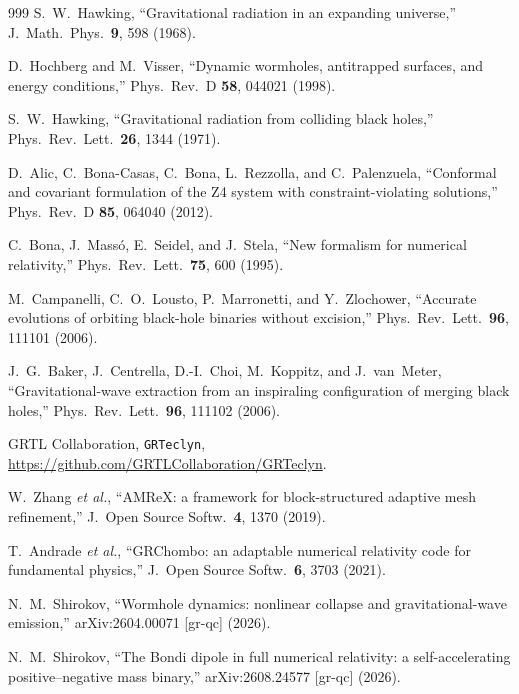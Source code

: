 \documentclass[twocolumn,floatfix,aps,prd,superscriptaddress,nofootinbib]{revtex4-2}
\begin{document}
\begin{thebibliography}{999}
S.~W.~Hawking,
\newblock ``Gravitational radiation in an expanding universe,''
\newblock J.\ Math.\ Phys.\ \textbf{9}, 598 (1968).

D.~Hochberg and M.~Visser,
\newblock ``Dynamic wormholes, antitrapped surfaces, and energy conditions,''
\newblock Phys.\ Rev.\ D \textbf{58}, 044021 (1998).

S.~W.~Hawking,
\newblock ``Gravitational radiation from colliding black holes,''
\newblock Phys.\ Rev.\ Lett.\ \textbf{26}, 1344 (1971).

D.~Alic, C.~Bona-Casas, C.~Bona, L.~Rezzolla, and C.~Palenzuela,
\newblock ``Conformal and covariant formulation of the Z4 system with constraint-violating solutions,''
\newblock Phys.\ Rev.\ D \textbf{85}, 064040 (2012).

C.~Bona, J.~Mass\'o, E.~Seidel, and J.~Stela,
\newblock ``New formalism for numerical relativity,''
\newblock Phys.\ Rev.\ Lett.\ \textbf{75}, 600 (1995).

M.~Campanelli, C.~O.~Lousto, P.~Marronetti, and Y.~Zlochower,
\newblock ``Accurate evolutions of orbiting black-hole binaries without excision,''
\newblock Phys.\ Rev.\ Lett.\ \textbf{96}, 111101 (2006).

J.~G.~Baker, J.~Centrella, D.-I.~Choi, M.~Koppitz, and J.~van~Meter,
\newblock ``Gravitational-wave extraction from an inspiraling configuration of merging black holes,''
\newblock Phys.\ Rev.\ Lett.\ \textbf{96}, 111102 (2006).

GRTL Collaboration,
\newblock \texttt{GRTeclyn},
\newblock \url{https://github.com/GRTLCollaboration/GRTeclyn}.

W.~Zhang \emph{et al.},
\newblock ``AMReX: a framework for block-structured adaptive mesh refinement,''
\newblock J.\ Open Source Softw.\ \textbf{4}, 1370 (2019).

T.~Andrade \emph{et al.},
\newblock ``GRChombo: an adaptable numerical relativity code for fundamental physics,''
\newblock J.\ Open Source Softw.\ \textbf{6}, 3703 (2021).

N.~M.~Shirokov,
\newblock ``Wormhole dynamics: nonlinear collapse and gravitational-wave emission,''
\newblock arXiv:2604.00071 [gr-qc] (2026).

N.~M.~Shirokov,
\newblock ``The Bondi dipole in full numerical relativity: a self-accelerating positive--negative mass binary,''
\newblock arXiv:2608.24577 [gr-qc] (2026).


\end{thebibliography}
\end{document}
